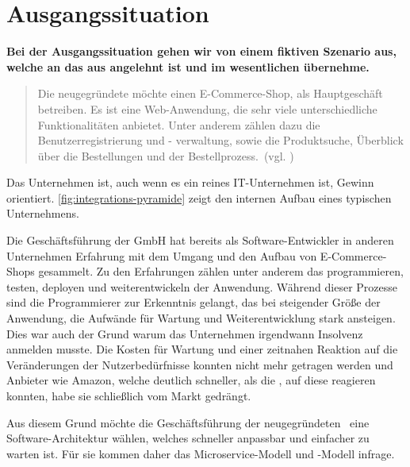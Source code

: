 \section{Ausgangssituation}
\label{sec:ausgangssituation}
\textbf{Bei der Ausgangssituation gehen wir von einem fiktiven Szenario aus, welche an das aus \cite[S. 15]{EWolff2016:Microservices} angelehnt ist und im wesentlichen übernehme.}

\begin{quotation}
    \frqq Die neugegründete \textit{\gmbh} möchte einen E-Commerce-Shop, als Hauptgeschäft betreiben. Es ist eine Web-Anwendung, die sehr viele unterschiedliche Funktionalitäten anbietet. Unter anderem zählen dazu die Benutzerregistrierung und - verwaltung, sowie die Produktsuche, Überblick über die Bestellungen und der Bestellprozess.\flqq\ (vgl. \cite[S. 15]{EWolff2016:Microservices})
\end{quotation}

Das Unternehmen ist, auch wenn es ein reines IT-Unternehmen ist, Gewinn orientiert. \ref{fig:integrations-pyramide} zeigt den internen Aufbau eines typischen Unternehmens.

Die Geschäftsführung der GmbH hat bereits als Software-Entwickler in anderen Unternehmen Erfahrung mit dem Umgang und den Aufbau von E-Commerce-Shops gesammelt. Zu den Erfahrungen zählen unter anderem das programmieren, testen, deployen und weiterentwickeln der Anwendung. Während dieser Prozesse sind die Programmierer zur Erkenntnis gelangt, das bei steigender Größe der Anwendung, die Aufwände für Wartung und Weiterentwicklung stark ansteigen. Dies war auch der Grund warum das Unternehmen irgendwann Insolvenz anmelden musste. Die Kosten für Wartung und einer zeitnahen Reaktion auf die Veränderungen der Nutzerbedürfnisse konnten nicht mehr getragen werden und Anbieter wie Amazon, welche deutlich schneller, als die \gmbh ,  auf diese reagieren konnten, habe sie schließlich vom Markt gedrängt.

Aus diesem Grund möchte die Geschäftsführung der neugegründeten \gmbh\ eine Software-Architektur wählen, welches schneller anpassbar und einfacher zu warten ist. Für sie kommen daher das Microservice-Modell und \SOA -Modell infrage.

